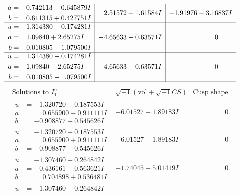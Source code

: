 \documentclass[1p]{elsarticle_modified}
\theoremstyle{definition}
\newcommand{\I}{\sqrt{-1}}
\begin{document}
$$\begin{array}{c|c|c}
\begin{aligned}
a &= -0.742113 - 0.645879 I \\
b &= \phantom{-}0.611315 + 0.427751 I\end{aligned}
 & \phantom{-}2.51572 + 1.61584 I & -1.91976 - 3.16837 I \\ \hline\begin{aligned}
u &= \phantom{-}1.314380 + 0.174281 I \\
a &= \phantom{-}1.09840 + 2.65275 I \\
b &= \phantom{-}0.010805 + 1.079500 I\end{aligned}
 & -4.65633 - 0.63571 I & \phantom{-0.000000 } 0 \\ \hline\begin{aligned}
u &= \phantom{-}1.314380 - 0.174281 I \\
a &= \phantom{-}1.09840 - 2.65275 I \\
b &= \phantom{-}0.010805 - 1.079500 I\end{aligned}
 & -4.65633 + 0.63571 I & \phantom{-0.000000 } 0\\
 \hline 
 \end{array}$$\newpage$$\begin{array}{c|c|c}  
\text{Solutions to }I^u_{1}& \I (\text{vol} + \sqrt{-1}CS) & \text{Cusp shape}\\
 \hline 
\begin{aligned}
u &= -1.320720 + 0.187553 I \\
a &= \phantom{-}0.655900 - 0.911111 I \\
b &= -0.908877 - 0.545626 I\end{aligned}
 & -6.01527 + 1.89183 I & \phantom{-0.000000 } 0 \\ \hline\begin{aligned}
u &= -1.320720 - 0.187553 I \\
a &= \phantom{-}0.655900 + 0.911111 I \\
b &= -0.908877 + 0.545626 I\end{aligned}
 & -6.01527 - 1.89183 I & \phantom{-0.000000 } 0 \\ \hline\begin{aligned}
u &= -1.307460 + 0.264842 I \\
a &= -0.436161 + 0.563621 I \\
b &= \phantom{-}0.704898 + 0.536481 I\end{aligned}
 & -1.74045 + 5.01419 I & \phantom{-0.000000 } 0 \\ \hline\begin{aligned}
u &= -1.307460 - 0.264842 I \\

\end{aligned}
\end{array}$$
\end{document}
